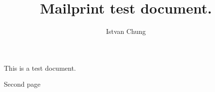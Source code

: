 \documentclass{article}
\title{Mailprint test document.}
\author{Istvan Chung}
\begin{document}
\maketitle

This is a test document.

\newpage

Second page
\end{document}
